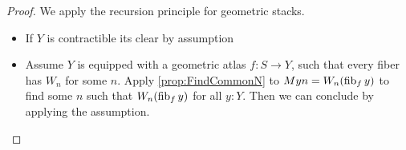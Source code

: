 \begin{proof}
		We apply the recursion principle for geometric stacks.
	\begin{itemize}
		\item If $Y$ is contractible its clear by assumption
		\item Assume $Y$ is equipped with a geometric atlas $f : S \to Y$, such that every fiber has $W_n$ for some $n$. Apply \ref{prop:FindCommonN} to $M y n = W_n (\operatorname{fib}_f y)$ to find some $n$ such that $W_n (\operatorname{fib}_f y)$ for all $y : Y$.
		Then we can conclude by applying the assumption.
	
	\end{itemize}
\end{proof}


